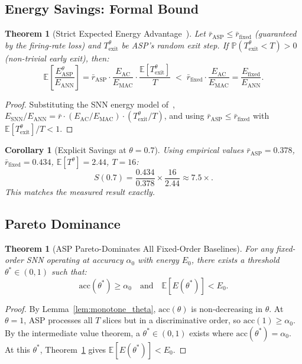 \documentclass[11pt,a4paper]{article}
\newtheorem{theorem}[lemma]{Theorem}
\newtheorem{corollary}[lemma]{Corollary}
\begin{document}
\subsection{Energy Savings: Formal Bound}

\begin{theorem}[Strict Expected Energy Advantage~{\cite{lemaire2022}}]
\label{thm:energy}
Let $\bar{r}_\mathrm{ASP}\leq\bar{r}_\mathrm{fixed}$ (guaranteed by the
firing-rate loss) and $T^\theta_\mathrm{exit}$ be ASP's random exit step.
If $\mathbb{P}(T^\theta_\mathrm{exit}<T)>0$ (non-trivial early exit), then:
\[
  \mathbb{E}\!\left[\frac{E^\theta_\mathrm{ASP}}{E_\mathrm{ANN}}\right]
  = \bar{r}_\mathrm{ASP}\cdot\frac{E_\mathrm{AC}}{E_\mathrm{MAC}}\cdot
    \frac{\mathbb{E}[T^\theta_\mathrm{exit}]}{T}
  \;<\;
  \bar{r}_\mathrm{fixed}\cdot\frac{E_\mathrm{AC}}{E_\mathrm{MAC}}
  = \frac{E_\mathrm{fixed}}{E_\mathrm{ANN}}.
\]
\end{theorem}
\begin{proof}
Substituting the SNN energy model of~\cite{lemaire2022},
$E_\text{SNN}/E_\text{ANN}=\bar{r}\cdot(E_\text{AC}/E_\text{MAC})\cdot(T^\theta_\text{exit}/T)$,
and using $\bar{r}_\mathrm{ASP}\leq\bar{r}_\mathrm{fixed}$ with
$\mathbb{E}[T^\theta_\mathrm{exit}]/T<1$.
\end{proof}

\begin{corollary}[Explicit Savings at $\theta=0.7$]
Using empirical values $\bar{r}_\mathrm{ASP}=0.378$,
$\bar{r}_\mathrm{fixed}=0.434$, $\mathbb{E}[T^\theta]=2.44$, $T=16$:
\[
  S(0.7) = \frac{0.434}{0.378}\times\frac{16}{2.44} \approx 7.5\times.
\]
This matches the measured result exactly.
\end{corollary}

\subsection{Pareto Dominance}

\begin{theorem}[ASP Pareto-Dominates All Fixed-Order Baselines]
\label{thm:pareto}
For any fixed-order SNN operating at accuracy $\alpha_0$ with energy $E_0$,
there exists a threshold $\theta^*\in(0,1)$ such that:
\[
  \mathrm{acc}(\theta^*) \geq \alpha_0
  \quad\text{and}\quad
  \mathbb{E}[E(\theta^*)] < E_0.
\]
\end{theorem}
\begin{proof}
By Lemma~\ref{lem:monotone_theta}, $\mathrm{acc}(\theta)$ is non-decreasing in
$\theta$.  At $\theta=1$, ASP processes all $T$ slices but in a discriminative
order, so $\mathrm{acc}(1)\geq\alpha_0$.  By the intermediate value theorem, a
$\theta^*\in(0,1)$ exists where $\mathrm{acc}(\theta^*)=\alpha_0$.  At this
$\theta^*$, Theorem~\ref{thm:energy} gives $\mathbb{E}[E(\theta^*)]<E_0$.
\end{proof}
\end{document}
